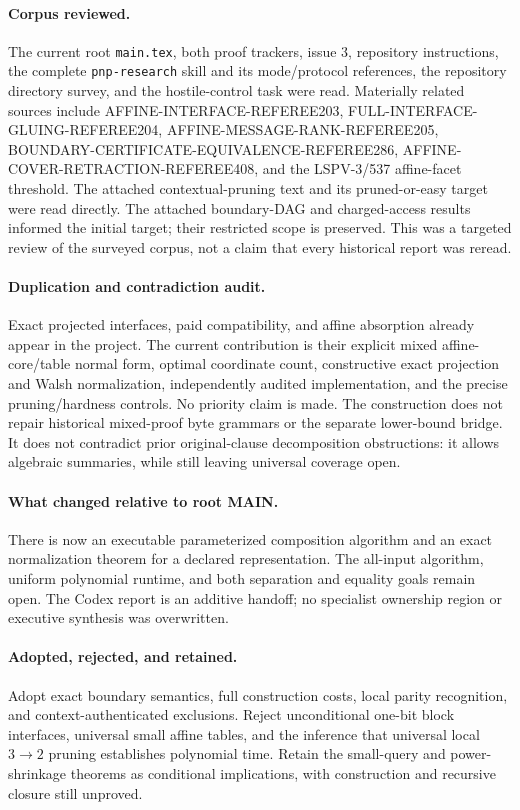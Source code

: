 \documentclass[11pt]{article}
\begin{document}
\paragraph{Corpus reviewed.}
The current root \texttt{main.tex}, both proof trackers, issue 3, repository
instructions, the complete \texttt{pnp-research} skill and its mode/protocol
references, the repository directory survey, and the hostile-control task were
read. Materially related sources include AFFINE-INTERFACE-REFEREE203,
FULL-INTERFACE-GLUING-REFEREE204, AFFINE-MESSAGE-RANK-REFEREE205,
BOUNDARY-CERTIFICATE-EQUIVALENCE-REFEREE286, AFFINE-COVER-RETRACTION-REFEREE408,
and the LSPV-3/537 affine-facet threshold. The attached contextual-pruning text
and its pruned-or-easy target were read directly. The attached boundary-DAG and
charged-access results informed the initial target; their restricted scope is
preserved. This was a targeted review of the surveyed corpus, not a claim that
every historical report was reread.

\paragraph{Duplication and contradiction audit.}
Exact projected interfaces, paid compatibility, and affine absorption already
appear in the project. The current contribution is their explicit mixed
affine-core/table normal form, optimal coordinate count, constructive exact
projection and Walsh normalization, independently audited implementation, and
the precise pruning/hardness controls. No priority claim is made. The construction
does not repair historical mixed-proof byte grammars or the separate lower-bound
bridge. It does not contradict prior original-clause decomposition obstructions:
it allows algebraic summaries, while still leaving universal coverage open.

\paragraph{What changed relative to root MAIN.}
There is now an executable parameterized composition algorithm and an exact
normalization theorem for a declared representation. The all-input algorithm,
uniform polynomial runtime, and both separation and equality goals remain open.
The Codex report is an additive handoff; no specialist ownership region or
executive synthesis was overwritten.

\paragraph{Adopted, rejected, and retained.}
Adopt exact boundary semantics, full construction costs, local parity recognition,
and context-authenticated exclusions. Reject unconditional one-bit block interfaces,
universal small affine tables, and the inference that universal local $3\to2$
pruning establishes polynomial time. Retain the small-query and power-shrinkage
theorems as conditional implications, with construction and recursive closure
still unproved.
\end{document}
